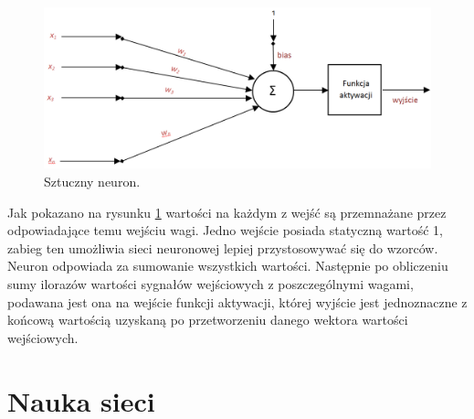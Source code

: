 \begin{figure}[!htbp]
\centering
\includegraphics[width=1\linewidth]{./include/perceptron}
\caption{Sztuczny neuron.}
\label{fig:perceptron}
\end{figure}

Jak pokazano na rysunku \ref{fig:perceptron} wartości na każdym z wejść są przemnażane przez odpowiadające temu wejściu wagi. Jedno wejście posiada statyczną wartość 1, zabieg ten umożliwia sieci neuronowej lepiej przystosowywać się do wzorców. Neuron odpowiada za sumowanie wszystkich wartości. Następnie po obliczeniu sumy ilorazów wartości sygnałów wejściowych z poszczególnymi wagami, podawana jest ona na wejście funkcji aktywacji, której wyjście jest jednoznaczne z końcową wartością uzyskaną po przetworzeniu danego wektora wartości wejściowych. 

\section{Nauka sieci}

